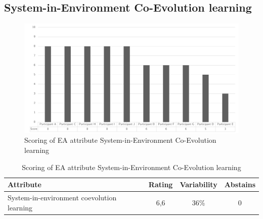 \subsection{System-in-Environment Co-Evolution learning}
\begin{figure}[h!]
	\centering
	\includegraphics[width=0.9\linewidth]{images/scoreeasysteminenvironmentcoevolution}
	\caption[Scoring of EA attribute System-in-Environment Co-Evolution learning]{Scoring of EA attribute System-in-Environment Co-Evolution learning}
	\label{fig:appscoringeasysteminenvironmentcoevolutionlearning}
\end{figure}
\begin{table}[h!]
	\centering
	\begin{tabular}{p{}ccc}
		\toprule
		\textbf{Attribute} & \textbf{Rating} & \textbf{Variability} & \textbf{Abstains} \\
		\midrule
		System-in-environment coevolution learning & 6,6 & 36\% & 0 \\%
		\bottomrule
	\end{tabular}%
	\caption[Scoring of EA attribute System-in-Environment Co-Evolution learning]{Scoring of EA attribute System-in-Environment Co-Evolution learning}
	\label{tab:appscoringeasysteminenvironmentcoevolutionlearning}%
\end{table}%
\newpage
